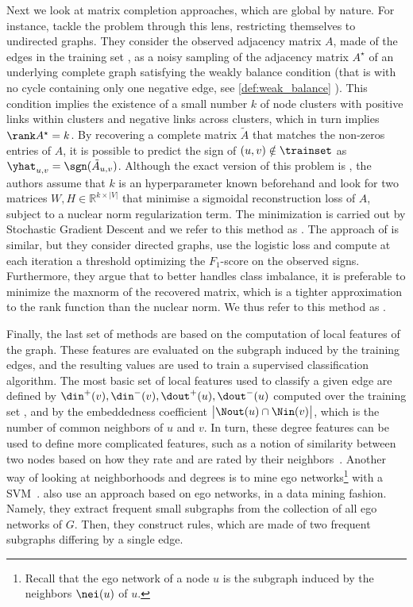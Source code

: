 Next we look at matrix completion approaches, which are global by nature.
For instance, \Textcite{LowRankCompletion14} tackle the \esp{} problem through this lens,
restricting themselves to undirected graphs. They consider the
observed adjacency matrix $A$, made of the edges in the training set \trainset{}, as a noisy
sampling of the adjacency matrix $A^\star$ of an underlying complete graph satisfying the weakly
balance condition (that is with no cycle containing only one negative edge, see
\autoref{def:weak_balance} ).
This condition implies the existence of a small number $k$ of node clusters with positive links
within clusters and negative links across clusters, which in turn implies $\rank A^\star=k$.  By
recovering a complete matrix $\tilde{A}$ that matches the non-zeros entries of $A$, it is possible
to predict the sign of $(u,v) \notin \trainset$ as $\yhat_{u,v} = \sgn(\tilde{A}_{u,v})$. Although
the exact version of this problem is \NPh{}, the authors assume that $k$ is an hyperparameter known
beforehand and look for two matrices $W,H\in \mathbb{R}^{k\times|V|}$ that minimise a sigmoidal
reconstruction loss of $A$, subject to a nuclear norm regularization term. The minimization is
carried out by Stochastic Gradient Descent and we refer to this method as \emph{\complowrank{}}.
The approach of \textcite{OnlineCompletion17} is similar, but they consider directed graphs, use the
logistic loss and compute at each iteration a threshold optimizing the $F_1$-score on the observed
signs. Furthermore, they argue that to better handles class imbalance, it is preferable to minimize
the maxnorm of the recovered matrix, which is a tighter approximation to the rank function than the
nuclear norm. We thus refer to this method as \compmaxnorm{}.

\medskip

Finally, the last set of methods
are based on the computation of local features of the graph. These features are
evaluated on the subgraph induced by the training edges, and the resulting values are used to train
a supervised classification algorithm. The most basic set of local
features used to classify a given edge \euv{} are defined by
$\din^+(v),\din^-(v),\dout^+(u),\dout^-(u)$ computed over the training set \trainset{}, and by the
embeddedness coefficient $\big|\Nout(u) \cap \Nin(v)\big|$, which is the number of
common neighbors of $u$ and $v$. In turn, these degree features can be used to define more
complicated features, such as a notion of similarity between two nodes based on how they rate and
are rated by their neighbors~\autocite{Yuan2017}.
Another way of looking at neighborhoods and degrees is to mine ego networks\footnote{Recall that the
ego network of a node $u$ is the subgraph induced by the neighbors $\nei(u)$ of $u$.} with a
SVM~\autocite{Papaoikonomou2014}. \Textcite{Bachi2012} also use an approach based on ego networks,
in a data mining fashion. Namely, they extract frequent small subgraphs from the collection of all
ego networks of $G$. Then, they construct rules, which are made of two frequent subgraphs differing
by a single edge.

